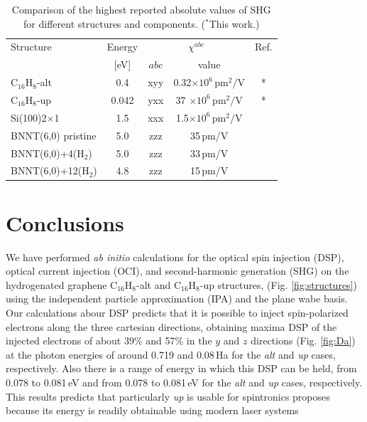 \documentclass[pss]{wiley2sp} %
\begin{document}
\begin{table}[htb]%
  \sidecaption
  \begin{tabular}{lcccc}
  \hline
    Structure & Energy & \multicolumn{2}{c}{$\chi^{abc} $} &  Ref.\\
    \cline{3-4}
              & [eV]   & $abc$ & value \\
    \hline
    C$_{16}$H$_{8}$-alt   & 0.4   & xyy   & 0.32$\times 10^{6}\,\mathrm{pm}^{2}/\mathrm{V}$  & *     \\
    C$_{16}$H$_{8}$-up    & 0.042 & yxx   & 37 $\times 10^{6}\,\mathrm{pm}^{2}/\mathrm{V}$  & *     \\
    Si(100)2$\times$1     & 1.5   & xxx   & 1.5$\times 10^{6}\,\mathrm{pm}^{2}/\mathrm{V}$  & \cite{andersonPRB15}  \\
    BNNT(6,0) pristine    & 5.0   & zzz   & 35\,pm/V  & \cite{salazarPRB14} \\
    BNNT(6,0)+4(H$_{2}$)  & 5.0   & zzz   & 33\,pm/V  & \cite{salazarPRB14} \\
    BNNT(6,0)+12(H$_{2}$) & 4.8   & zzz   & 15\,pm/V  & \cite{salazarPRB14} \\
  \hline
  \end{tabular}
  \caption[]{%
  Comparison of the highest reported absolute values of SHG for 
    different structures and components. ($^{*}$This work.)}
  \label{tab:shgcomp}
\end{table}



\section{Conclusions}\label{sec:conclusions}

We have performed \emph{ab initio} calculations for the optical spin injection (DSP), optical current injection (OCI), and second-harmonic generation (SHG) on the hydrogenated graphene C$_{16}$H$_{8}$-alt and C$_{16}$H$_{8}$-up structures, (Fig. \ref{fig:structures}) using the independent particle approximation (IPA) and the plane wabe basis. Our calculations abour DSP predicts that it is possible to inject spin-polarized electrons along the three cartesian directions, obtaining maxima DSP of the injected electrons of about 39\% and 57\% in the $y$ and $z$ directions  (Fig. \ref{fig:Da}) at the photon energies of around 0.719 and 0.08\,Ha  for the \emph{alt} and \emph{up} cases, respectively. Also there is a range of energy in which this DSP can be held, from 0.078 to 0.081\,eV and from 0.078 to 0.081\,eV for the \emph{alt} and \emph{up} cases, respectively. This results predicts that particularly \emph{up} is usable for spintronics proposes because its energy is readily obtainable using modern laser systems
\end{document}
